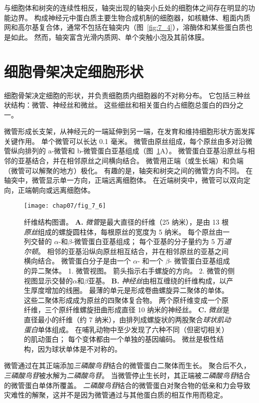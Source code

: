 与细胞体和树突的连续性相反，轴突出现的轴突小丘处的细胞体之间存在明显的功能边界。
构成神经元中蛋白质主要生物合成机制的细胞器，如核糖体、粗面内质网和高尔基复合体，通常不包括在轴突内（图~\ref{fig:7_4}），溶酶体和某些蛋白质也是如此。
然而，轴突富含光滑内质网、单个突触小泡及其前体膜。



\section{细胞骨架决定细胞形状}

细胞骨架决定细胞的形状，并负责细胞质内细胞器的不对称分布。
它包括三种丝状结构：微管、神经丝和微丝。 
这些细丝和相关蛋白约占细胞总蛋白的四分之一。


微管形成长支架，从神经元的一端延伸到另一端，在发育和维持细胞形状方面发挥关键作用。
单个微管可以长达 0.1 毫米。
微管由原丝组成，每个原丝由多对沿微管纵向排列的 a-微管和 b-微管蛋白亚基组成（图~\ref{fig:7_6}A）。 
微管蛋白亚基沿原丝与相邻的亚基结合，并在相邻原丝之间横向结合。
微管用正端（或生长端）和负端（微管可以解聚的地方）极化。
有趣的是，轴突和树突之间的微管方向不同。
在轴突中，微管显示单一方向，正端远离细胞体。
在近端树突中，微管可以双向定向，正端朝向或远离细胞体。


\begin{figure}[htbp]
	\centering
	\texttt{[image: chap07/fig\_7\_6]}
	\caption{纤维结构图谱。
		\textbf{A.} \textit{微管}是最大直径的纤维（25 纳米），是由 13 根\textit{原丝}组成的螺旋圆柱体，每根原丝的宽度为 5 纳米。
		每个原丝由一列交替的 $\alpha$-和$\beta$-微管蛋白亚基组成；
		每个亚基的分子量约为 5 万\textit{道尔顿}。
		相邻的亚基沿纵向原丝相互结合，并在相邻原丝的亚基之间横向结合。
		微管蛋白分子是由一个 $\alpha$- 和一个 $\beta$- 微管蛋白亚基组成的异二聚体。
		1. 微管视图。
		箭头指示右手螺旋的方向。
		2. 微管的侧视图显示交替的$\alpha$和$\beta$亚基。
		\textbf{B.} \textit{神经丝}由相互缠绕的纤维构成，以产生厚度增加的线圈。
		最薄的单元是形成卷曲螺旋异二聚体的单体。
		这些二聚体形成成为原丝的四聚体复合物。
		两个原纤维变成一个原纤维，三个原纤维螺旋扭曲形成直径 10 纳米的神经丝\cite{bershadsky2012cytoskeleton}。
		\textbf{C.} \textit{微丝}是直径最小的纤维（约 7 纳米），由排列成螺旋状的两股聚合\textit{球状肌动蛋白}单体组成。
		在哺乳动物中至少发现了六种不同（但密切相关）的肌动蛋白；
		每个变体都由一个单独的基因编码。
		微丝是极性结构，因为球状单体是不对称的。}
	\label{fig:7_6}
\end{figure}


微管通过在其正端添加\textit{三磷酸鸟苷}结合的微管蛋白二聚体而生长。
聚合后不久，\textit{三磷酸鸟苷}被水解为\textit{二磷酸鸟苷}。
当微管停止生长时，其正端被\textit{二磷酸鸟苷}结合的微管蛋白单体所覆盖。
\textit{二磷酸鸟苷}结合的微管蛋白对聚合物的低亲和力会导致灾难性的解聚，这并不是因为微管通过与其他蛋白质的相互作用而稳定。


